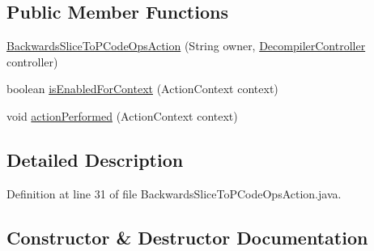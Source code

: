 \subsection*{Public Member Functions}
\begin{DoxyCompactItemize}
\item 
\mbox{\hyperlink{classghidra_1_1app_1_1plugin_1_1core_1_1decompile_1_1actions_1_1_backwards_slice_to_p_code_ops_action_af2d53247f661d33815626873690a6abb}{Backwards\+Slice\+To\+P\+Code\+Ops\+Action}} (String owner, \mbox{\hyperlink{classghidra_1_1app_1_1decompiler_1_1component_1_1_decompiler_controller}{Decompiler\+Controller}} controller)
\item 
boolean \mbox{\hyperlink{classghidra_1_1app_1_1plugin_1_1core_1_1decompile_1_1actions_1_1_backwards_slice_to_p_code_ops_action_aec675d76eec5fcc0d1ba30e780e50e02}{is\+Enabled\+For\+Context}} (Action\+Context context)
\item 
void \mbox{\hyperlink{classghidra_1_1app_1_1plugin_1_1core_1_1decompile_1_1actions_1_1_backwards_slice_to_p_code_ops_action_ad6dff03b45d55b7dbd9e1c60540bbec9}{action\+Performed}} (Action\+Context context)
\end{DoxyCompactItemize}


\subsection{Detailed Description}


Definition at line 31 of file Backwards\+Slice\+To\+P\+Code\+Ops\+Action.\+java.



\subsection{Constructor \& Destructor Documentation}
\mbox{\label{classghidra_1_1app_1_1plugin_1_1core_1_1decompile_1_1actions_1_1_backwards_slice_to_p_code_ops_action_af2d53247f661d33815626873690a6abb}} 
